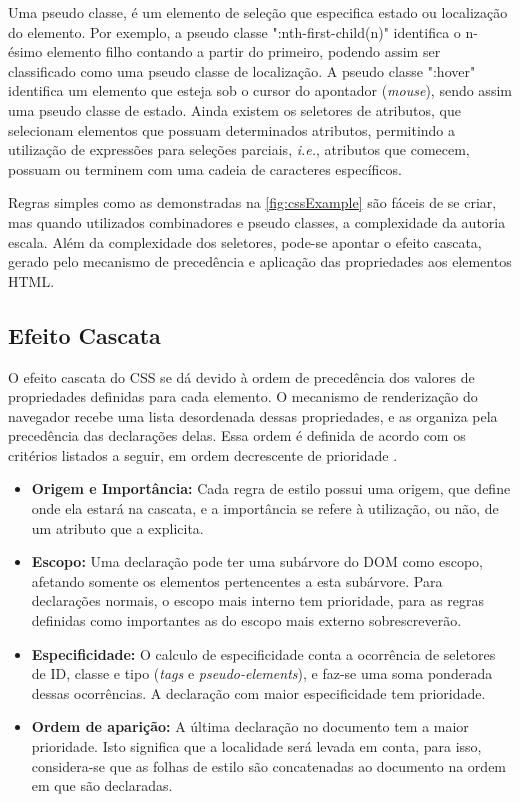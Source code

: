 Uma pseudo classe, é um elemento de seleção que especifica estado ou localização do elemento. Por exemplo, a pseudo classe ":nth-first-child(n)" identifica o n-ésimo elemento filho contando a partir do primeiro, podendo assim ser classificado como uma pseudo classe de localização. A pseudo classe ":hover" identifica um elemento que esteja sob o cursor do apontador (\textit{mouse}), sendo assim uma pseudo classe de estado. Ainda existem os seletores de atributos, que selecionam elementos que possuam determinados atributos, permitindo a utilização de expressões para seleções parciais, \textit{i.e.}, atributos que comecem, possuam ou terminem com uma cadeia de caracteres específicos.

Regras simples como as demonstradas na \autoref{fig:cssExample} são fáceis de se criar, mas quando utilizados combinadores e pseudo classes, a complexidade da autoria escala. Além da complexidade dos seletores, pode-se apontar o efeito cascata, gerado pelo mecanismo de precedência e aplicação das propriedades aos elementos HTML.

\subsection{Efeito Cascata}
\label{subsec:cascade}

O efeito cascata do CSS se dá devido à ordem de precedência dos valores de propriedades definidas para cada elemento. O mecanismo de renderização do navegador recebe uma lista desordenada dessas propriedades, e as organiza pela precedência das declarações delas. Essa ordem é definida de acordo com os critérios listados a seguir, em ordem decrescente de prioridade \cite{CSScascade2015}.

\begin{itemize}
	\item \textbf{Origem e Importância:} 
	Cada regra de estilo possui uma origem, que define onde ela estará na cascata, e a importância se refere à utilização, ou não, de um atributo que a explicita.
	\item \textbf{Escopo:}
	Uma declaração pode ter uma subárvore do DOM como escopo, afetando somente os elementos pertencentes a esta subárvore. Para declarações normais, o escopo mais interno tem prioridade, para as regras definidas como importantes as do escopo mais externo sobrescreverão.
	\item \textbf{Especificidade:}
	O calculo de especificidade conta a ocorrência de seletores de ID, classe e tipo (\textit{tags} e \textit{pseudo-elements}), e faz-se uma soma ponderada dessas ocorrências. A declaração com maior especificidade tem prioridade.
	\item \textbf{Ordem de aparição:}
	A última declaração no documento tem a maior prioridade. Isto significa que a localidade será levada em conta, para isso, considera-se que as folhas de estilo são concatenadas ao documento na ordem em que são declaradas.
\end{itemize}

